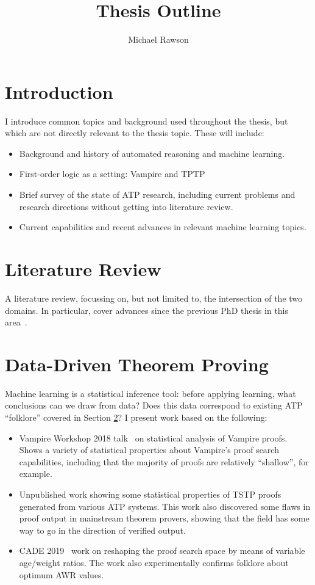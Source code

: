 \documentclass[a4paper]{article}
\title{Thesis Outline}
\author{Michael Rawson}
\begin{document}
\maketitle
{}
\section{Introduction}
I introduce common topics and background used throughout the thesis, but which are not directly relevant to the thesis topic.
These will include:
\begin{itemize}
	\item Background and history of automated reasoning and machine learning.
	\item First-order logic as a setting: Vampire and TPTP
	\item Brief survey of the state of ATP research, including current problems and research directions without getting into literature review.
	\item Current capabilities and recent advances in relevant machine learning topics.
\end{itemize}

\section{Literature Review}
\label{sec:lit-review}
A literature review, focussing on, but not limited to, the intersection of the two domains.
In particular, cover advances since the previous PhD thesis in this area~\cite{bridge}.

\section{Data-Driven Theorem Proving}
\label{sec:data}
Machine learning is a statistical inference tool: before applying learning, what conclusions can we draw from data?
Does this data correspond to existing ATP ``folklore'' covered in Section \ref{sec:lit-review}?
I present work based on the following:
\begin{itemize}
	\item Vampire Workshop 2018 talk~\cite{vampire2018} on statistical analysis of Vampire proofs. Shows a variety of statistical properties about Vampire's proof search capabilities, including that the majority of proofs are relatively ``shallow'', for example.
	\item Unpublished work showing some statistical properties of TSTP proofs generated from various ATP systems. This work also discovered some flaws in proof output in mainstream theorem provers, showing that the field has some way to go in the direction of verified output.
	\item CADE 2019~\cite{cade2019} work on reshaping the proof search space by means of variable age/weight ratios. The work also experimentally confirms folklore about optimum AWR values.
\end{itemize}
\end{document}
